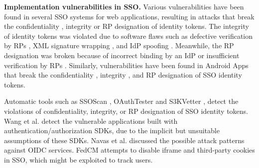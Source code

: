 \noindent\textbf{Implementation vulnerabilities in SSO.}
Various vulnerabilities have been found in several SSO systems for web applications, resulting in attacks %
that break the confidentiality \cite{WangCW12,ccsSunB12,ArmandoCCCPS13,DiscoveringJCS,dimvaLiM16}, integrity \cite{WangCW12,SomorovskyMSKJ12,WangZLG16,MainkaMS16, MainkaMSW17,dimvaLiM16} or RP designation \cite{WangZLG16,MainkaMS16,MainkaMSW17,YangLCZ18,dimvaLiM16} of identity tokens.
The integrity of identity tokens was violated %
due to software flaws such as defective verification by RPs \cite{WangCW12,WangZLG16,MainkaMSW17}, XML signature wrapping \cite{SomorovskyMSKJ12}, and IdP spoofing \cite{MainkaMS16,MainkaMSW17}.
Meanwhile, the RP designation was broken because of incorrect binding by an IdP \cite{YangLCZ18,WangZLG16} or insufficient verification by RPs \cite{MainkaMS16,MainkaMSW17,YangLCZ18}. Similarly, vulnerabilities have been found in Android Apps that break the confidentiality \cite{ChenPCTKT14,WangZLLYLG15,YangLS17,ShiWL19}, integrity \cite{ChenPCTKT14,YangLS17}, and RP designation \cite{ChenPCTKT14,ShiWL19,WangZLLYLG15} of SSO identity tokens.

Automatic tools such as SSOScan \cite{ZhouE14}, OAuthTester \cite{YangLLZH16} and S3KVetter \cite{YangLCZ18},
 detect the violations of confidentiality, integrity, or RP designation of SSO identity tokens.
 Wang et al. \cite{ExplicatingSDK} detect the vulnerable applications
     built with authentication/authorization SDKs,
      due to the implicit but unsuitable assumptions of these SDKs.
 Navas et al. \cite{NavasB19} discussed the possible attack patterns against OIDC services.
FedCM \cite{FedCM} attempts to disable iframe and third-party cookies in SSO, which might be exploited to track users.






